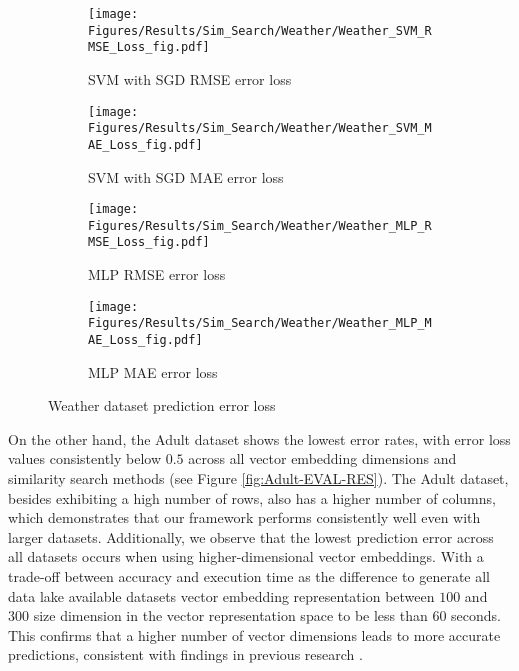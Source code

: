 \begin{figure}[t!]
     \centering
     \begin{subfigure}[b]{0.24\textwidth}
         \centering
         \texttt{[image: Figures/Results/Sim\_Search/Weather/Weather\_SVM\_RMSE\_Loss\_fig.pdf]}
         \caption{SVM with SGD RMSE error loss}
         \label{fig:Weather-SVM-RMSE}
     \end{subfigure}
     \hfill 
     \begin{subfigure}[b]{0.24\textwidth}
         \centering
         \texttt{[image: Figures/Results/Sim\_Search/Weather/Weather\_SVM\_MAE\_Loss\_fig.pdf]}
         \caption{SVM with SGD MAE error loss}
         \label{fig:Weather-SVM-MAE}
     \end{subfigure}
        
     \begin{subfigure}[b]{0.24\textwidth}
         \centering
         \texttt{[image: Figures/Results/Sim\_Search/Weather/Weather\_MLP\_RMSE\_Loss\_fig.pdf]}
         \caption{MLP RMSE error loss}
         \label{fig:Weather-MLP-RMSE}
     \end{subfigure}
     \hfill 
     \begin{subfigure}[b]{0.24\textwidth}
         \centering
         \texttt{[image: Figures/Results/Sim\_Search/Weather/Weather\_MLP\_MAE\_Loss\_fig.pdf]}
         \caption{MLP MAE error loss}
         \label{fig:Weather-MLP-MAE}
     \end{subfigure}
        \caption{Weather dataset prediction error loss}
        \label{fig:Weather-EVAL-RES}
\end{figure}

On the other hand, the Adult dataset shows the lowest error rates, with error loss values consistently below $0.5$ across all vector embedding dimensions and similarity search methods (see Figure \ref{fig:Adult-EVAL-RES}). The Adult dataset, besides exhibiting a high number of rows, also has a higher number of columns, which demonstrates that our framework performs consistently well even with larger datasets.
Additionally, we observe that the lowest prediction error across all datasets occurs when using higher-dimensional vector embeddings. With a trade-off between accuracy and execution time as the difference to generate all data lake available datasets vector embedding representation between $100$ and $300$ size dimension in the vector representation space to be less than $60$ seconds. This confirms that a higher number of vector dimensions leads to more accurate predictions, consistent with findings in previous research \cite{b8Word2Vec}.



